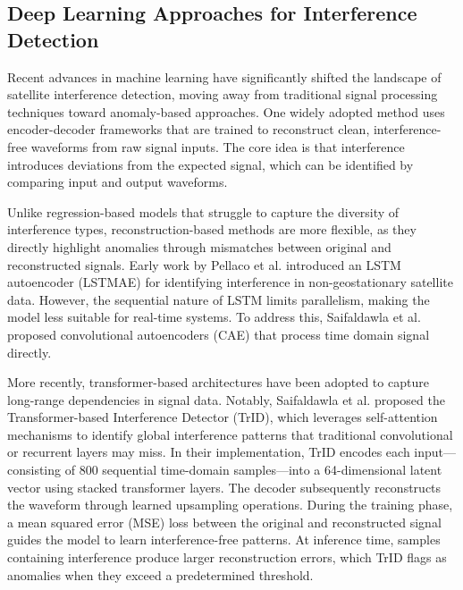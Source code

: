 \documentclass[conference]{IEEEtran}
\begin{document}
\subsection{Deep Learning Approaches for Interference Detection}
\label{ssec:related_works}

Recent advances in machine learning have significantly shifted the landscape of satellite interference detection, moving away from traditional signal processing techniques toward anomaly-based approaches. One widely adopted method uses encoder-decoder frameworks that are trained to reconstruct clean, interference-free waveforms from raw signal inputs. The core idea is that interference introduces deviations from the expected signal, which can be identified by comparing input and output waveforms.

Unlike regression-based models that struggle to capture the diversity of interference types, reconstruction-based methods are more flexible, as they directly highlight anomalies through mismatches between original and reconstructed signals. Early work by Pellaco et al. \cite{pellacoSpectrumPredictionInterference2019} introduced an LSTM autoencoder (LSTMAE) for identifying interference in non-geostationary satellite data. However, the sequential nature of LSTM limits parallelism, making the model less suitable for real-time systems. To address this, Saifaldawla et al. \cite{saifaldawlaConvolutionalAutoencodersNonGeostationary2024} proposed convolutional autoencoders (CAE) that process time domain signal directly.

More recently, transformer-based architectures have been adopted to capture long-range dependencies in signal data. Notably, Saifaldawla et al. \cite{saifaldawlaGenAIBasedModelsNGSO2024} proposed the Transformer-based Interference Detector (TrID), which leverages self-attention mechanisms to identify global interference patterns that traditional convolutional or recurrent layers may miss. In their implementation, TrID encodes each input—consisting of 800 sequential time-domain samples—into a 64-dimensional latent vector using stacked transformer layers. The decoder subsequently reconstructs the waveform through learned upsampling operations. During the training phase, a mean squared error (MSE) loss between the original and reconstructed signal guides the model to learn interference-free patterns. At inference time, samples containing interference produce larger reconstruction errors, which TrID flags as anomalies when they exceed a predetermined threshold.
\end{document}
